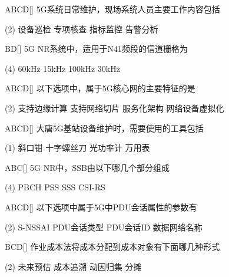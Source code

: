 \begin{choice}{\;ABCD\;}[]
    5G系统日常维护，现场系统人员主要工作内容包括
    \begin{tasks}(2)
        \task 设备巡检
        \task 专项核查
        \task 指标监控
        \task 告警分析
    \end{tasks}
\end{choice}

\begin{choice}{\;BD\;}[]
    5G NR系统中，适用于N41频段的信道栅格为
    \begin{tasks}(4)
        \task 60kHz
        \task 15kHz
        \task 100kHz
        \task 30kHz
    \end{tasks}
\end{choice}

\begin{choice}{\;ABCD\;}[]
    以下选项中，属于5G核心网的主要特征的是
    \begin{tasks}(2)
        \task 支持边缘计算
        \task 支持网络切片
        \task 服务化架构
        \task 网络设备虚拟化
    \end{tasks}
\end{choice}

\begin{choice}{\;ABCD\;}[]
    大唐5G基站设备维护时，需要使用的工具包括
    \begin{tasks}(1)
        \task 斜口钳
        \task 十字螺丝刀
        \task  光功率计
        \task 万用表
    \end{tasks}
\end{choice}

\begin{choice}{\;ABC\;}[]
    5G NR中，SSB由以下哪几个部分组成
    \begin{tasks}(4)
        \task PBCH
        \task PSS
        \task SSS
        \task CSI-RS
    \end{tasks}
\end{choice}

\begin{choice}{\;ABCD\;}[]
    以下选项中属于5G中PDU会话属性的参数有
    \begin{tasks}(2)
        \task S-NSSAI
        \task PDU会话类型
        \task PDU会话ID
        \task 数据网络名称
    \end{tasks}
\end{choice}

\begin{choice}{\;BCD\;}[]
    作业成本法将成本分配到成本对象有下面哪几种形式
    \begin{tasks}(2)
        \task 未来预估
        \task 成本追溯
        \task 动因归集
        \task 分摊
    \end{tasks}
\end{choice}

